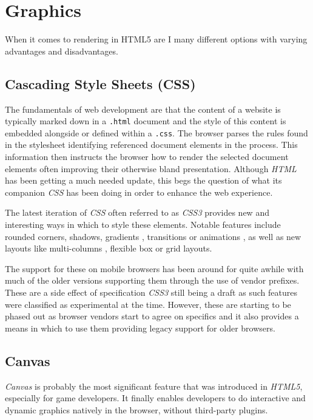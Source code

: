 \documentclass[final]{cmpreport}
\begin{document}
\section{Graphics}
When it comes to rendering in HTML5 are I many different options with varying advantages and disadvantages.

\subsection{Cascading Style Sheets (CSS)}
The fundamentals of web development are that the content of a website is typically marked down in a \texttt{.html} document and the style of this content is embedded alongside or defined within a \texttt{.css}. The browser parses the rules found in the stylesheet identifying referenced document elements in the process. This information then instructs the browser how to render the selected document elements often improving their otherwise bland presentation. Although \textit{HTML} has been getting a much needed update, this begs the question of what its companion \textit{CSS} has been doing in order to enhance the web experience. 

The latest iteration of \textit{CSS} often referred to as \textit{CSS3} provides new and interesting ways in which to style these elements. Notable features include rounded corners, shadows, gradients , transitions or animations , as well as new layouts like multi-columns , flexible box or grid layouts\footnotemark[5].


The support for these on mobile browsers has been around for quite awhile with much of the older versions supporting them through the use of vendor prefixes. These are a side effect of specification \textit{CSS3} still being a draft as such features were classified as experimental at the time. However, these are starting to be phased out as browser vendors start to agree on specifics and it also provides a means in which to use them providing legacy support for older browsers.

\subsection{Canvas}
\textit{Canvas} is probably the most significant feature that was introduced in \textit{HTML5}, especially for game developers. It finally enables developers to do interactive and dynamic graphics natively in the browser, without third-party plugins.
\end{document}
